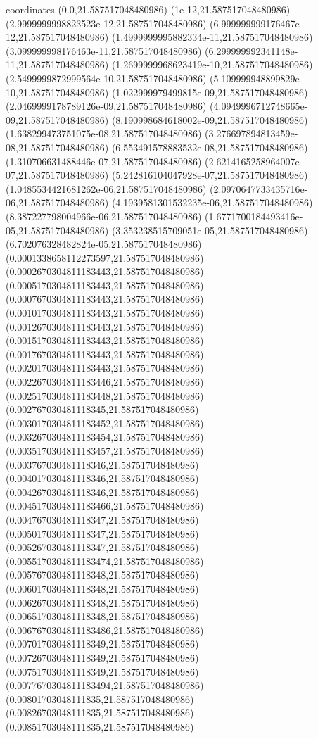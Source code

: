 coordinates {%
(0.0,21.587517048480986)
(1e-12,21.587517048480986)
(2.9999999998823523e-12,21.587517048480986)
(6.999999999176467e-12,21.587517048480986)
(1.4999999995882334e-11,21.587517048480986)
(3.099999998176463e-11,21.587517048480986)
(6.299999992341148e-11,21.587517048480986)
(1.2699999968623419e-10,21.587517048480986)
(2.5499999872999564e-10,21.587517048480986)
(5.109999948899829e-10,21.587517048480986)
(1.022999979499815e-09,21.587517048480986)
(2.0469999178789126e-09,21.587517048480986)
(4.0949996712748665e-09,21.587517048480986)
(8.190998684618002e-09,21.587517048480986)
(1.638299473751075e-08,21.587517048480986)
(3.276697894813459e-08,21.587517048480986)
(6.553491578883532e-08,21.587517048480986)
(1.310706631488446e-07,21.587517048480986)
(2.6214165258964007e-07,21.587517048480986)
(5.242816104047928e-07,21.587517048480986)
(1.0485534421681262e-06,21.587517048480986)
(2.0970647733435716e-06,21.587517048480986)
(4.1939581301532235e-06,21.587517048480986)
(8.387227798004966e-06,21.587517048480986)
(1.6771700184493416e-05,21.587517048480986)
(3.353238515709051e-05,21.587517048480986)
(6.702076328482824e-05,21.587517048480986)
(0.0001338658112273597,21.587517048480986)
(0.0002670304811183443,21.587517048480986)
(0.0005170304811183443,21.587517048480986)
(0.0007670304811183443,21.587517048480986)
(0.0010170304811183443,21.587517048480986)
(0.0012670304811183443,21.587517048480986)
(0.0015170304811183443,21.587517048480986)
(0.0017670304811183443,21.587517048480986)
(0.0020170304811183443,21.587517048480986)
(0.0022670304811183446,21.587517048480986)
(0.0025170304811183448,21.587517048480986)
(0.002767030481118345,21.587517048480986)
(0.0030170304811183452,21.587517048480986)
(0.0032670304811183454,21.587517048480986)
(0.0035170304811183457,21.587517048480986)
(0.003767030481118346,21.587517048480986)
(0.004017030481118346,21.587517048480986)
(0.004267030481118346,21.587517048480986)
(0.0045170304811183466,21.587517048480986)
(0.004767030481118347,21.587517048480986)
(0.005017030481118347,21.587517048480986)
(0.005267030481118347,21.587517048480986)
(0.0055170304811183474,21.587517048480986)
(0.005767030481118348,21.587517048480986)
(0.006017030481118348,21.587517048480986)
(0.006267030481118348,21.587517048480986)
(0.006517030481118348,21.587517048480986)
(0.0067670304811183486,21.587517048480986)
(0.007017030481118349,21.587517048480986)
(0.007267030481118349,21.587517048480986)
(0.007517030481118349,21.587517048480986)
(0.0077670304811183494,21.587517048480986)
(0.00801703048111835,21.587517048480986)
(0.00826703048111835,21.587517048480986)
(0.00851703048111835,21.587517048480986)
}
